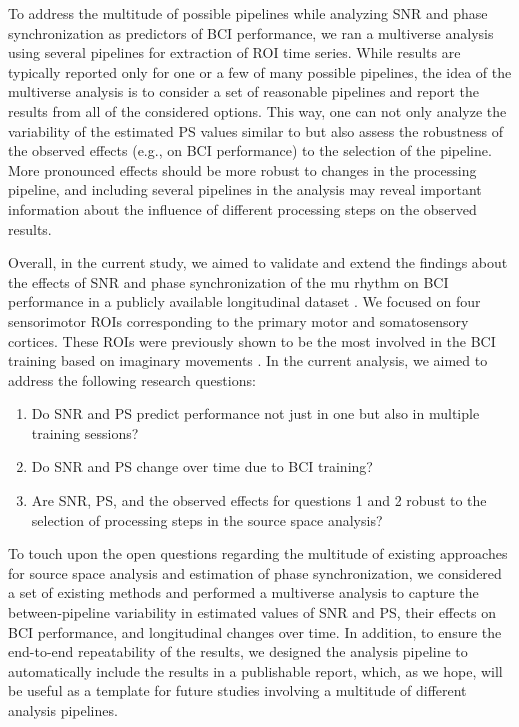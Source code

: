To address the multitude of possible pipelines while analyzing SNR and phase synchronization as predictors of BCI performance, we ran a multiverse analysis \citep{Steegen2016} using several pipelines for extraction of ROI time series. While results are typically reported only for one or a few of many possible pipelines, the idea of the multiverse analysis is to consider a set of reasonable pipelines and report the results from all of the considered options. This way, one can not only analyze the variability of the estimated PS values similar to \cite{Mahjoory2017} but also assess the robustness of the observed effects (e.g., on BCI performance) to the selection of the pipeline. More pronounced effects should be more robust to changes in the processing pipeline, and including several pipelines in the analysis may reveal important information about the influence of different processing steps on the observed results.

\medskip

Overall, in the current study, we aimed to validate and extend the findings about the effects of SNR and phase synchronization of the mu rhythm on BCI performance in a publicly available longitudinal dataset \citep{Stieger2021_dataset}. We focused on four sensorimotor ROIs corresponding to the primary motor and somatosensory cortices. These ROIs were previously shown to be the most involved in the BCI training based on imaginary movements \citep{Samek2016, Vidaurre2020, Nierhaus2021}. In the current analysis, we aimed to address the following research questions:

\begin{enumerate}
    \item Do SNR and PS predict performance not just in one but also in multiple training sessions?
    \item Do SNR and PS change over time due to BCI training?
    \item Are SNR, PS, and the observed effects for questions 1 and 2 robust to the selection of processing steps in the source space analysis?
\end{enumerate}

To touch upon the open questions regarding the multitude of existing approaches for source space analysis and estimation of phase synchronization, we considered a set of existing methods and performed a multiverse analysis to capture the between-pipeline variability in estimated values of SNR and PS, their effects on BCI performance, and longitudinal changes over time. In addition, to ensure the end-to-end repeatability of the results, we designed the analysis pipeline to automatically include the results in a publishable report, which, as we hope, will be useful as a template for future studies involving a multitude of different analysis pipelines.